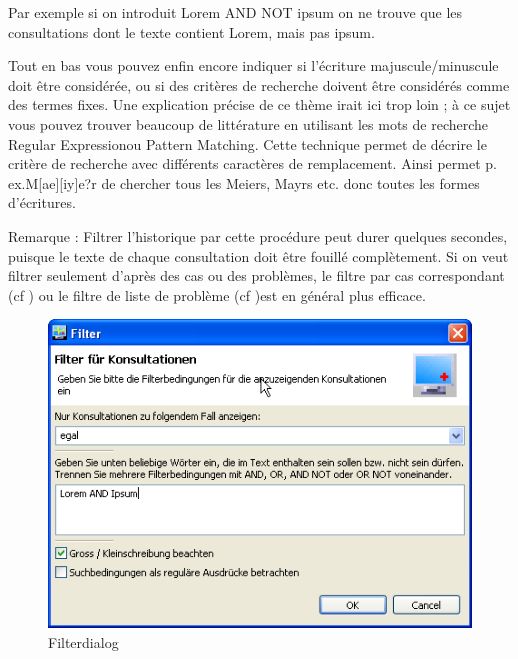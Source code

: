 Par exemple si on introduit \glqq Lorem AND NOT ipsum\grqq{} on ne trouve que les consultations dont le texte contient  \glqq Lorem\grqq, mais pas \glqq ipsum\grqq{}.

Tout en bas vous pouvez enfin encore indiquer si l'écriture majuscule/minuscule doit être considérée, ou si des critères de recherche doivent être considérés comme des termes fixes. Une explication précise de ce thème irait ici trop loin ; à ce sujet vous pouvez trouver beaucoup de littérature en utilisant les mots de recherche \glqq Regular
Expression\grqq{}ou \glqq Pattern Matching\grqq{}. Cette technique permet de décrire le critère de recherche avec différents caractères de remplacement. Ainsi permet p. ex.\glqq M[ae][iy]e?r\grqq{} de chercher tous les Meiers, Mayrs etc. donc toutes les formes d'écritures.

\medskip

Remarque : 
Filtrer l'historique par cette procédure peut durer quelques secondes, puisque le texte de chaque consultation doit être fouillé complètement. Si on veut filtrer seulement d'après des cas ou des problèmes, le filtre par cas correspondant  (cf \pageref{filter:fall}) ou le filtre de liste de problème  (cf \pageref{filter:problemliste})est en général plus efficace.

\begin{figure}[ht]
\begin{center}
  \includegraphics{images/filterdialog}
  \caption{Filterdialog}
  \label{fig:konsfilter}
\end{center}
\end{figure}


